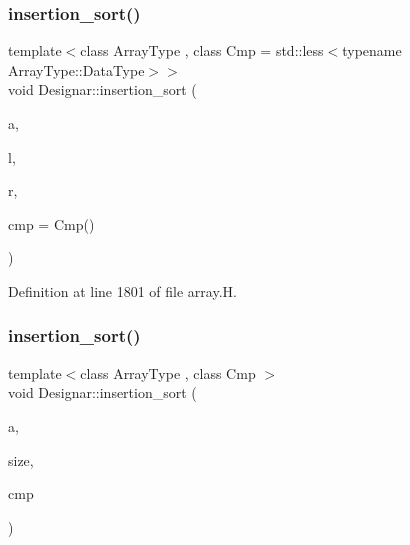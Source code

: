 \subsubsection{\texorpdfstring{insertion\+\_\+sort()}{insertion\_sort()}\hspace{0.1cm}{\footnotesize\ttfamily [2/6]}}
{\footnotesize\ttfamily template$<$class Array\+Type , class Cmp  = std\+::less$<$typename Array\+Type\+::\+Data\+Type$>$$>$ \\
void Designar\+::insertion\+\_\+sort (\begin{DoxyParamCaption}\item[{Array\+Type \&}]{a,  }\item[{\hyperlink{namespace_designar_a9d113d66a39e82b73727c72cd3a52f73}{lint\+\_\+t}}]{l,  }\item[{\hyperlink{namespace_designar_a9d113d66a39e82b73727c72cd3a52f73}{lint\+\_\+t}}]{r,  }\item[{Cmp \&\&}]{cmp = {\ttfamily Cmp()} }\end{DoxyParamCaption})\hspace{0.3cm}{\ttfamily [inline]}}



Definition at line 1801 of file array.\+H.

\mbox{\label{namespace_designar_a54b704ec22eb8fe7136b1bda64daf3a7}} 
\subsubsection{\texorpdfstring{insertion\+\_\+sort()}{insertion\_sort()}\hspace{0.1cm}{\footnotesize\ttfamily [3/6]}}
{\footnotesize\ttfamily template$<$class Array\+Type , class Cmp $>$ \\
void Designar\+::insertion\+\_\+sort (\begin{DoxyParamCaption}\item[{Array\+Type \&}]{a,  }\item[{\hyperlink{namespace_designar_a9d113d66a39e82b73727c72cd3a52f73}{lint\+\_\+t}}]{size,  }\item[{Cmp \&}]{cmp }\end{DoxyParamCaption})\hspace{0.3cm}{\ttfamily [inline]}}



